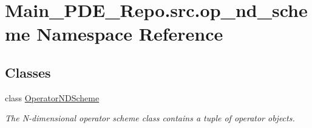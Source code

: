 \hypertarget{namespaceMain__PDE__Repo_1_1src_1_1op__nd__scheme}{}\section{Main\+\_\+\+P\+D\+E\+\_\+\+Repo.\+src.\+op\+\_\+nd\+\_\+scheme Namespace Reference}
\label{namespaceMain__PDE__Repo_1_1src_1_1op__nd__scheme}
\subsection*{Classes}
\begin{DoxyCompactItemize}
\item 
class \hyperlink{classMain__PDE__Repo_1_1src_1_1op__nd__scheme_1_1OperatorNDScheme}{Operator\+N\+D\+Scheme}
\begin{DoxyCompactList}\small\item\em The N-\/dimensional operator scheme class contains a tuple of operator objects. \end{DoxyCompactList}\end{DoxyCompactItemize}
